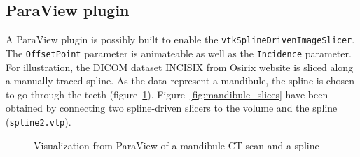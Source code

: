 \documentclass{InsightArticle}
\begin{document}
\subsection{ParaView plugin}
%
A ParaView plugin is possibly built to enable the 
\verb!vtkSplineDrivenImageSlicer!. The \verb!OffsetPoint! parameter is
animateable as well as the \verb!Incidence! parameter. For illustration, the
DICOM dataset INCISIX from Osirix website \cite{OSIRIX,INCISIX} is sliced along
a manually traced spline. As the data represent a mandibule, the spline is
chosen
to go through the teeth (figure~\ref{fig:mandibule_spline}). 
Figure~\ref{fig:mandibule_slices} have been obtained by connecting two 
spline-driven slicers to the volume and the spline (\verb!spline2.vtp!).
%
\begin{figure}
\centering
{}
\caption{Visualization from ParaView of a mandibule CT scan and a spline}
\label{fig:mandibule_spline}
\end{figure}
%
\end{document}
